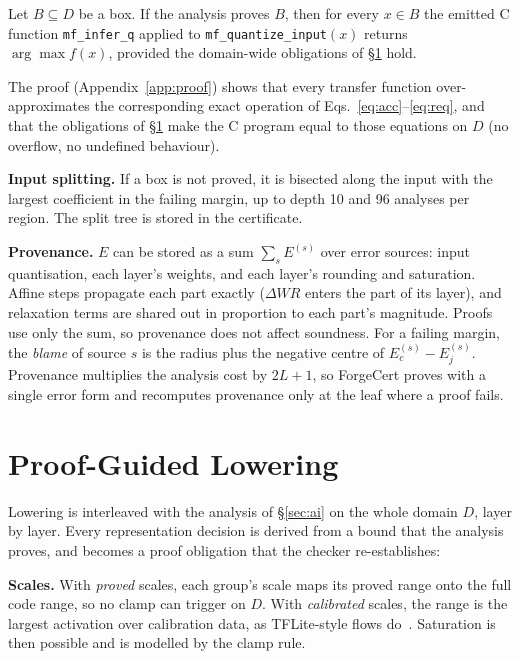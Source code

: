 \begin{theorem}[Soundness]\label{thm:sound}
Let $B\subseteq D$ be a box. If the analysis proves $B$, then for every $x\in B$ the emitted C function \texttt{mf\_infer\_q} applied to \texttt{mf\_quantize\_input}$(x)$ returns $\arg\max f(x)$, provided the domain-wide obligations of \S\ref{sec:lower} hold.
\end{theorem}
\noindent The proof (Appendix~\ref{app:proof}) shows that every transfer function over-approximates the corresponding exact operation of Eqs.~\eqref{eq:acc}--\eqref{eq:req}, and that the obligations of \S\ref{sec:lower} make the C program equal to those equations on $D$ (no overflow, no undefined behaviour).

\textbf{Input splitting.} If a box is not proved, it is bisected along the input with the largest coefficient in the failing margin, up to depth 10 and 96 analyses per region. The split tree is stored in the certificate.

\textbf{Provenance.} $E$ can be stored as a sum $\sum_s E^{(s)}$ over error sources: input quantisation, each layer's weights, and each layer's rounding and saturation. Affine steps propagate each part exactly ($\Delta W R$ enters the part of its layer), and relaxation terms are shared out in proportion to each part's magnitude. Proofs use only the sum, so provenance does not affect soundness. For a failing margin, the \emph{blame} of source $s$ is the radius plus the negative centre of $E^{(s)}_c-E^{(s)}_j$. Provenance multiplies the analysis cost by $2L+1$, so ForgeCert proves with a single error form and recomputes provenance only at the leaf where a proof fails.

\section{Proof-Guided Lowering}\label{sec:lower}
Lowering is interleaved with the analysis of \S\ref{sec:ai} on the whole domain $D$, layer by layer. Every representation decision is derived from a bound that the analysis proves, and becomes a proof obligation that the checker re-establishes:

\textbf{Scales.} With \emph{proved} scales, each group's scale maps its proved range onto the full code range, so no clamp can trigger on $D$. With \emph{calibrated} scales, the range is the largest activation over calibration data, as TFLite-style flows do~\cite{jacob}. Saturation is then possible and is modelled by the clamp rule.

